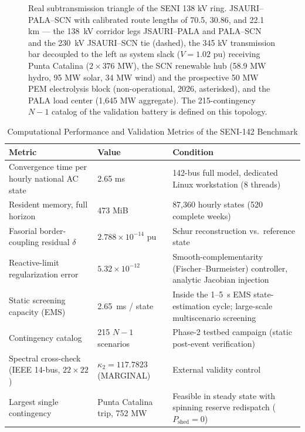 \begin{figure}[!t]
\centering
\resizebox{0.85\textwidth}{!}{} %
\caption{Real subtransmission triangle of the SENI 138 kV ring. JSAURI--PALA--SCN with calibrated route lengths of 70.5, 30.86, and 22.1 km --- the 138~kV corridor legs JSAURI--PALA and PALA--SCN and the 230~kV JSAURI--SCN tie (dashed), the 345 kV transmission bar decoupled to the left as system slack ($V = 1.02$ pu) receiving Punta Catalina ($2 \times 376$ MW), the SCN renewable hub (58.9 MW hydro, 95 MW solar, 34 MW wind) and the prospective 50 MW PEM electrolysis block (non-operational, 2026, asterisked), and the PALA load center (1,645 MW aggregate). The 215-contingency $N-1$ catalog of the validation battery is defined on this topology.}
\label{fig:topologia_seni}
\end{figure}

\begin{table}[!t]
\caption{Computational Performance and Validation Metrics of the SENI-142 Benchmark}
\label{tab:telemetry}
\centering
\footnotesize
\begin{tabular}{@{}p{} p{} p{}@{}}
\toprule
\textbf{Metric} & \textbf{Value} & \textbf{Condition} \\
\midrule
Convergence time per hourly national AC state & 2.65 ms & 142-bus full model, dedicated Linux workstation (8 threads) \\
Resident memory, full horizon & 473 MiB & 87,360 hourly states (520 complete weeks) \\
Fasorial border-coupling residual $\delta$ & $2.788 \times 10^{-14}$ pu & Schur reconstruction vs.\ reference state \\
Reactive-limit regularization error & $5.32 \times 10^{-12}$ & Smooth-complementarity (Fischer--Burmeister) controller, analytic Jacobian injection \\
Static screening capacity (EMS) & 2.65~ms / state & Inside the 1--5~s EMS state-estimation cycle; large-scale multiscenario screening \\
Contingency catalog & 215 $N-1$ scenarios & Phase-2 testbed campaign (static post-event verification) \\
Spectral cross-check (IEEE 14-bus, $22\times22$) & $\kappa_2 = 117.7823$ (MARGINAL) & External validity control \\
Largest single contingency & Punta Catalina trip, 752 MW & Feasible in steady state with spinning reserve redispatch ($P_{\mathrm{shed}} = 0$) \\
\bottomrule
\end{tabular}
\end{table}
